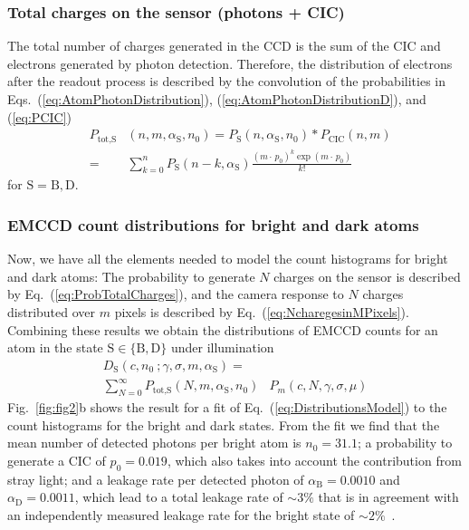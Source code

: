 \documentclass[aps,prl,twocolumn,english,showpacs]{revtex4-1}
\begin{document}
\subsubsection{Total charges on the sensor (photons + CIC)}

The total number of charges generated in the CCD is the sum of the CIC and electrons generated by photon detection. Therefore, the distribution of electrons after the readout process is described by the convolution of the probabilities in Eqs.~(\ref{eq:AtomPhotonDistribution}), (\ref{eq:AtomPhotonDistributionD}), and (\ref{eq:PCIC})
\begin{eqnarray}\label{eq:ProbTotalCharges}
&P_{\text{tot,S}}&\left(n,m,\alpha_{\text{S}},n_{0}\right)= P_{\text{S}}\left( n,\alpha_{\text{S}}, n_{0} \right)\ast
P_{\text{CIC}}\left( n,m\right) \nonumber  \\ 
&=&\sum_{k=0}^{n}P_{\text{S}}\left( n-k,\alpha_{\text{S}} \right) \frac{\left(m\cdot\,p_{0}\right) ^{k}\exp (m\cdot\,p_{0})}{k!}
\end{eqnarray}
for $\text{S}=\text{B},\text{D}$.\\

\subsubsection{EMCCD count distributions for bright and dark atoms}
 
Now, we have all the elements needed to model the count histograms for bright and dark atoms: The probability to generate $N$ charges on the sensor is described by Eq.~(\ref{eq:ProbTotalCharges}), and the camera response to $N$ charges distributed over $m$ pixels is described by Eq.~(\ref{eq:NcharegesinMPixels}). Combining these results we obtain the distributions of EMCCD counts for an atom in the state $\text{S}\in\{\text{B},\text{D}\}$ under illumination 
\begin{eqnarray}\label{eq:DistributionsModel}
D_{\text{S}}(c,n_{0}\ ; \gamma,\sigma, m,\alpha_ {\text{S}})= \ \ \ \ & \nonumber\\
\sum_{N=0}^{\infty }P_{\text{tot,S}}\left(N,m,\alpha_{\text{S}},n_{0}\right)&P_{m}\left(c,N,\gamma,\sigma,\mu\right) 
\end{eqnarray}
Fig.~\ref{fig:fig2}b shows the result for a fit of Eq.~(\ref{eq:DistributionsModel}) to the count histograms for the bright and dark states. From the fit we find that the mean number of detected photons per bright atom is $n_{0} = 31.1$; a probability to generate a CIC of $p_0=0.019$, which also takes into account the contribution from stray light; and a leakage rate per detected photon of $\alpha_\text{B}=0.0010$ and $\alpha_\text{D}=0.0011$, which lead to a total leakage rate of $\sim3\%$ that is in agreement with an independently measured leakage rate for the bright state of $\sim2\%$~\cite{LongPaper}.
\end{document}
